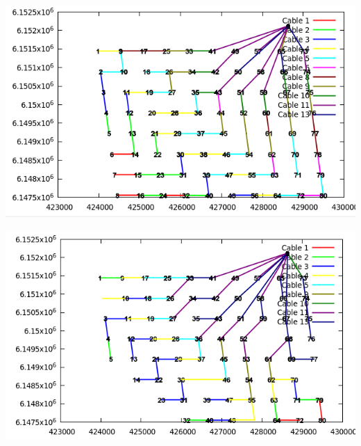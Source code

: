\begin{center}
	\includegraphics[scale=0.4]{Graphics/data02-relax2.png}
	\label{img:relax2}
\end{center}

\begin{center}
	\includegraphics[scale=0.4]{Graphics/data02-relax3.png}
	\label{img:relax3}
\end{center}
